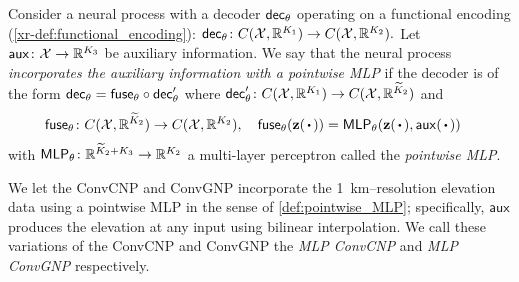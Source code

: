 \documentclass[12pt, twoside]{report}
\newcommand{\xrprefix}[1]{xr-#1}
\begin{document}
\begin{definition}
    \label{def:pointwise_MLP}
    Consider a neural process with a decoder $\mathsf{dec}_\theta$ operating on a functional encoding (\cref{\xrprefix{def:functional_encoding}}):
    $
        \mathsf{dec}_\theta \colon C(\mathcal{X}, \mathbb{R}^{K_1}) \to C(\mathcal{X}, \mathbb{R}^{K_2}).
    $
    Let $\mathsf{aux}\colon \mathcal{X} \to \mathbb{R}^{K_3}$ be auxiliary information.
    We say that the neural process \emph{incorporates the auxiliary information with a pointwise MLP} if the decoder is of the form $\mathsf{dec}_\theta = \mathsf{fuse}_\theta \circ \mathsf{dec}'_\theta$ where
    $\mathsf{dec}'_\theta\colon C(\mathcal{X}, \mathbb{R}^{K_1}) \to C(\mathcal{X}, \mathbb{R}^{\widetilde K_2})$ and
    \begin{align}
        \mathsf{fuse}_\theta &\colon C(\X, \R^{\widetilde K_2}) \to C(\X, \R^{K_2}), \quad
        \mathsf{fuse}_\theta(\vz(\vardot)) = \mathsf{MLP}_\theta(\vz(\vardot), \mathsf{aux}(\vardot))
    \end{align}
    with $\mathsf{MLP}_\theta \colon \mathbb{R}^{\widetilde K_2 + K_3} \to \mathbb{R}^{K_2}$ a multi-layer perceptron called the \emph{pointwise MLP}.
\end{definition}

We let the ConvCNP and ConvGNP incorporate the \SI{1}{km}--resolution elevation data using a pointwise MLP in the sense of \cref{def:pointwise_MLP};
specifically, $\mathsf{aux}$ produces the elevation at any input using bilinear interpolation.
We call these variations of the ConvCNP and ConvGNP the \emph{MLP ConvCNP} and \emph{MLP ConvGNP} respectively.
\end{document}
